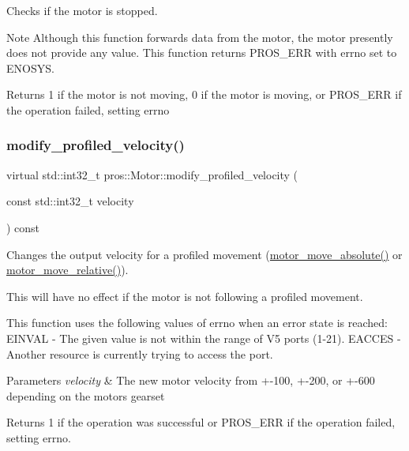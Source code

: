 Checks if the motor is stopped. 

\begin{DoxyNote}{Note}
Although this function forwards data from the motor, the motor presently does not provide any value. This function returns P\+R\+O\+S\+\_\+\+E\+RR with errno set to E\+N\+O\+S\+YS.
\end{DoxyNote}
\begin{DoxyReturn}{Returns}
1 if the motor is not moving, 0 if the motor is moving, or P\+R\+O\+S\+\_\+\+E\+RR if the operation failed, setting errno 
\end{DoxyReturn}
\mbox{\label{classpros_1_1Motor_a44f39232cec1caee6d668d8ff21dc28b}} 
\subsubsection{\texorpdfstring{modify\_profiled\_velocity()}{modify\_profiled\_velocity()}}
{\footnotesize\ttfamily virtual std\+::int32\+\_\+t pros\+::\+Motor\+::modify\+\_\+profiled\+\_\+velocity (\begin{DoxyParamCaption}\item[{const std\+::int32\+\_\+t}]{velocity }\end{DoxyParamCaption}) const\hspace{0.3cm}{\ttfamily [virtual]}}



Changes the output velocity for a profiled movement (\mbox{\hyperlink{motors_8h_ab70bf4937f1b5cefa15c11c15314c90e}{motor\+\_\+move\+\_\+absolute()}} or \mbox{\hyperlink{motors_8h_ab4c1ba35d69e8e9b49df0e848fa305d3}{motor\+\_\+move\+\_\+relative()}}). 

This will have no effect if the motor is not following a profiled movement.

This function uses the following values of errno when an error state is reached\+: E\+I\+N\+V\+AL -\/ The given value is not within the range of V5 ports (1-\/21). E\+A\+C\+C\+ES -\/ Another resource is currently trying to access the port.


\begin{DoxyParams}{Parameters}
{\em velocity} & The new motor velocity from +-\/100, +-\/200, or +-\/600 depending on the motor\textquotesingle{}s gearset\\
\hline
\end{DoxyParams}
\begin{DoxyReturn}{Returns}
1 if the operation was successful or P\+R\+O\+S\+\_\+\+E\+RR if the operation failed, setting errno. 
\end{DoxyReturn}
\mbox{\label{classpros_1_1Motor_a7ea9aedd4e12844be2584dc3f4b7a4bf}} 
